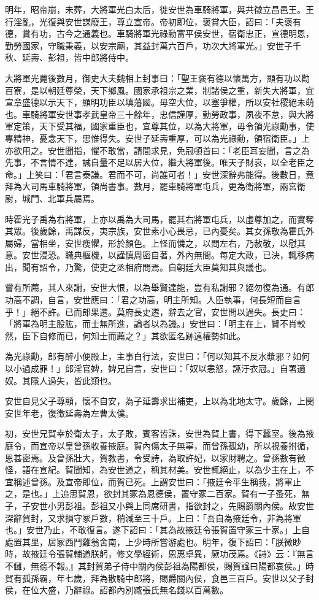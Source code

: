\begin{pinyinscope}
明年，昭帝崩，未葬，大將軍光白太后，徙安世為車騎將軍，與共徵立昌邑王。王行淫亂，光復與安世謀廢王，尊立宣帝。帝初即位，褒賞大臣，詔曰：「夫褒有德，賞有功，古今之通義也。車騎將軍光祿勳富平侯安世，宿衛忠正，宣德明恩，勤勞國家，守職秉義，以安宗廟，其益封萬六百戶，功次大將軍光。」安世子千秋、延壽、彭祖，皆中郎將侍中。

大將軍光薨後數月，御史大夫魏相上封事曰：「聖王褒有德以懷萬方，顯有功以勸百寮，是以朝廷尊榮，天下鄉風。國家承祖宗之業，制諸侯之重，新失大將軍，宜宣章盛德以示天下，顯明功臣以填藩國。毋空大位，以塞爭權，所以安社稷絕未萌也。車騎將軍安世事孝武皇帝三十餘年，忠信謹厚，勤勞政事，夙夜不怠，與大將軍定策，天下受其福，國家重臣也，宜尊其位，以為大將軍，毋令領光祿勳事，使專精神，憂念天下，思惟得失。安世子延壽重厚，可以為光祿勳，領宿衛臣。」上亦欲用之。安世聞指，懼不敢當，請間求見，免冠頓首曰：「老臣耳妄聞，言之為先事，不言情不達，誠自量不足以居大位，繼大將軍後。唯天子財哀，以全老臣之命。」上笑曰：「君言泰謙。君而不可，尚誰可者！」安世深辭弗能得。後數日，竟拜為大司馬車騎將軍，領尚書事。數月，罷車騎將軍屯兵，更為衛將軍，兩宮衛尉，城門、北軍兵屬焉。

時霍光子禹為右將軍，上亦以禹為大司馬，罷其右將軍屯兵，以虛尊加之，而實奪其眾。後歲餘，禹謀反，夷宗族，安世素小心畏忌，已內憂矣。其女孫敬為霍氏外屬婦，當相坐，安世瘦懼，形於顏色。上怪而憐之，以問左右，乃赦敬，以慰其意。安世浸恐。職典樞機，以謹慎周密自著，外內無間。每定大政，已決，輒移病出，聞有詔令，乃驚，使吏之丞相府問焉。自朝廷大臣莫知其與議也。

嘗有所薦，其人來謝，安世大恨，以為舉賢達能，豈有私謝邪？絕勿復為通。有郎功高不調，自言，安世應曰：「君之功高，明主所知。人臣執事，何長短而自言乎！」絕不許。已而郎果遷。莫府長史遷，辭去之官，安世問以過失。長史曰：「將軍為明主股肱，而士無所進，論者以為譏。」安世曰：「明主在上，賢不肖較然，臣下自修而已，何知士而薦之？」其欲匿名跡遠權勢如此。

為光祿勳，郎有醉小便殿上，主事白行法，安世曰：「何以知其不反水漿邪？如何以小過成罪！」郎淫官婢，婢兄自言，安世曰：「奴以恚怒，誣汙衣冠。」自署適奴。其隱人過失，皆此類也。

安世自見父子尊顯，懷不自安，為子延壽求出補吏，上以為北地太守。歲餘，上閔安世年老，復徵延壽為左曹太僕。

初，安世兄賀幸於衛太子，太子敗，賓客皆誅，安世為賀上書，得下蠶室。後為掖庭令，而宣帝以皇曾孫收養掖庭。賀內傷太子無辜，而曾孫孤幼，所以視養拊循，恩甚密焉。及曾孫壯大，賀教書，令受詩，為取許妃，以家財聘之。曾孫數有徵怪，語在宣紀。賀聞知，為安世道之，稱其材美。安世輒絕止，以為少主在上，不宜稱述曾孫。及宣帝即位，而賀已死。上謂安世曰：「掖廷令平生稱我，將軍止之，是也。」上追思賀恩，欲封其冢為恩德侯，置守冢二百家。賀有一子蚤死，無子，子安世小男彭祖。彭祖又小與上同席研書，指欲封之，先賜爵關內侯。故安世深辭賀封，又求損守冢戶數，稍減至三十戶。上曰：「吾自為掖廷令，非為將軍也。」安世乃止，不敢復言。遂下詔曰：「其為故掖廷令張賀置守冢三十家。」上自處置其里，居冢西鬥雞翁舍南，上少時所嘗游處也。明年，復下詔曰：「朕微眇時，故掖廷令張賀輔道朕躬，修文學經術，恩惠卓異，厥功茂焉。《詩》云：『無言不讎，無德不報。』其封賀弟子侍中關內侯彭祖為陽都侯，賜賀諡曰陽都哀侯。」時賀有孤孫霸，年七歲，拜為散騎中郎將，賜爵關內侯，食邑三百戶。安世以父子封侯，在位大盛，乃辭祿。詔都內別臧張氏無名錢以百萬數。


\end{pinyinscope}

